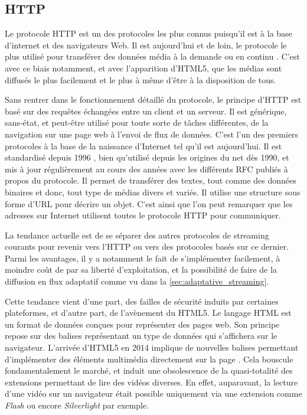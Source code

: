 \documentclass{polytech/polytech}
\begin{document}
\subsection{HTTP}
\label{subsec:http}

Le protocole HTTP est un des protocoles les plus connus puisqu’il est à la base d’internet et des navigateurs Web. Il est aujourd’hui et de loin, le protocole le plus utilisé pour transférer des données média à la demande ou en continu \cite{_live_2017}. C’est avec ce biais notamment, et avec l’apparition d’HTML5, que les médias sont diffusés le plus facilement et le plus à même d’être à la disposition de tous.

Sans rentrer dans le fonctionnement détaillé du protocole, le principe d’HTTP est basé sur des requêtes échangées entre un client et un serveur. Il est générique, sans-état, et peut-être utilisé pour toute sorte de tâches différentes, de la navigation sur une page web à l’envoi de flux de données. C’est l’un des premiers protocoles à la base de la naissance d’Internet tel qu’il est aujourd’hui. Il est standardisé depuis 1996 \cite{fielding_hypertext_1996}, bien qu’utilisé depuis les origines du net dès 1990, et mis à jour régulièrement au cours des années avec les différents RFC publiés à propos du protocole. Il permet de transférer des textes, tout comme des données binaires et donc, tout type de médias divers et variés. Il utilise une structure sous forme d’URL pour décrire un objet. C’est ainsi que l’on peut remarquer que les adresses sur Internet utilisent toutes le protocole HTTP pour communiquer.

La tendance actuelle est de se séparer des autres protocoles de streaming courants pour revenir vers l’HTTP ou vers des protocoles basés sur ce dernier. Parmi les avantages, il y a notamment le fait de s’implémenter facilement, à moindre coût de par sa liberté d’exploitation, et la possibilité de faire de la diffusion en flux adaptatif comme vu dans la \autoref{sec:adaptative_streaming}.


Cette tendance vient d’une part, des failles de sécurité induits par certaines plateformes, et d’autre part, de l’avènement du HTML5. Le langage HTML est un format de données conçues pour représenter des pages web. Son principe repose sur des balises représentant un type de données qui s’affichera sur le navigateur. L’arrivée d’HTML5 en 2014 implique de nouvelles balises permettant d’implémenter des éléments multimédia directement sur la page \cite{_html5_2017}. Cela bouscule fondamentalement le marché, et induit une obsolescence de la quasi-totalité des extensions permettant de lire des vidéos diverses. En effet, auparavant, la lecture d’une vidéo sur un navigateur était possible uniquement via une extension comme \textit{Flash} ou encore \textit{Silverlight} par exemple.
\end{document}

